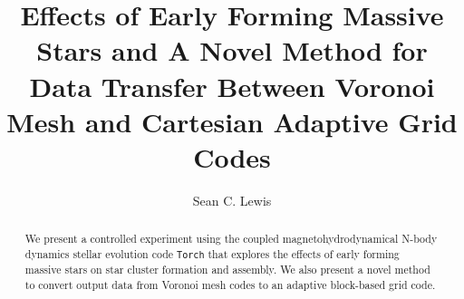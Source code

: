 \documentclass[twoside]{drexel-thesis}
\author{Sean C. Lewis}    %
\title{Effects of Early Forming Massive Stars and A Novel Method for Data Transfer Between Voronoi Mesh and Cartesian Adaptive Grid Codes}     %
\begin{document}
\begin{preamble}

\begin{dedications} %

\end{dedications}

\begin{acknowledgments} %
\end{acknowledgments}

\tableofcontents
\listoftables  %
\listoffigures %

\begin{abstract}
We present a controlled experiment using the coupled magnetohydrodynamical N-body dynamics stellar evolution code \texttt{Torch} that explores the effects of early forming massive stars on star cluster formation and assembly. We also present a novel method to convert output data from Voronoi mesh codes to an adaptive block-based grid code. 
\end{abstract}
\end{preamble}
\end{document}
